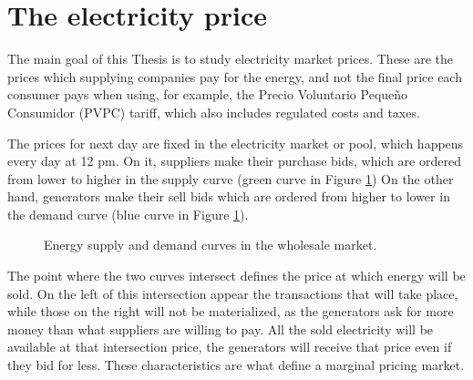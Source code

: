 \section{The electricity price}
The main goal of this Thesis is to study electricity market prices.
These are the prices which supplying companies pay for the energy, and not the final price each consumer pays when using, for example, the Precio Voluntario Pequeño Consumidor (PVPC) tariff, which also includes regulated costs and taxes. \cite{mercado-electrico-xataka}

The prices for next day are fixed in the electricity market or pool, which happens every day at 12 pm.
On it, suppliers make their purchase bids, which are ordered from lower to higher in the supply curve (green curve in Figure \ref{fig:supply-demand-curves})
On the other hand, generators make their sell bids which are ordered from higher to lower in the demand curve (blue curve in Figure \ref{fig:supply-demand-curves}).

\begin{figure}[H]
\centering
    \caption{Energy supply and demand curves in the wholesale market. \cite{curva-oferta-demanda}}
    \label{fig:supply-demand-curves}
\end{figure}

The point where the two curves intersect defines the price at which energy will be sold. On the left of this intersection appear the transactions that will take place, while those on the right will not be materialized, as the generators ask for more money than what suppliers are willing to pay.
All the sold electricity will be available at that intersection price, the generators will receive that price even if they bid for less. These characteristics are what define a marginal pricing market.

